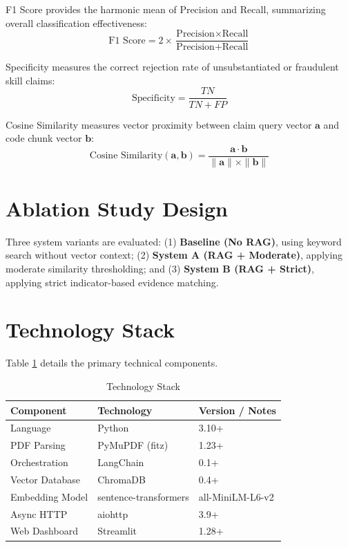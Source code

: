 F1 Score provides the harmonic mean of Precision and Recall, summarizing overall classification effectiveness:
\begin{equation}
\text{F1 Score} = 2 \times \frac{\text{Precision} \times \text{Recall}}{\text{Precision} + \text{Recall}}
\end{equation}

Specificity measures the correct rejection rate of unsubstantiated or fraudulent skill claims:
\begin{equation}
\text{Specificity} = \frac{TN}{TN + FP}
\end{equation}

Cosine Similarity measures vector proximity between claim query vector $\mathbf{a}$ and code chunk vector $\mathbf{b}$:
\begin{equation}
\text{Cosine Similarity}(\mathbf{a}, \mathbf{b}) = \frac{\mathbf{a} \cdot \mathbf{b}}{\|\mathbf{a}\| \times \|\mathbf{b}\|}
\end{equation}

\section{Ablation Study Design}

Three system variants are evaluated: (1) \textbf{Baseline (No RAG)}, using keyword search without vector context; (2) \textbf{System A (RAG + Moderate)}, applying moderate similarity thresholding; and (3) \textbf{System B (RAG + Strict)}, applying strict indicator-based evidence matching.

\section{Technology Stack}

Table \ref{tab:techstack} details the primary technical components.

\begin{table}[htbp]
\centering
\small
\setlength{\tabcolsep}{10pt}
\caption{Technology Stack}
\label{tab:techstack}
\begin{tabularx}{\textwidth}{@{}llX@{}}
\toprule
\textbf{Component} & \textbf{Technology} & \textbf{Version / Notes} \\ \midrule
Language & Python & 3.10+ \\
PDF Parsing & PyMuPDF (fitz) \cite{ref40} & 1.23+ \\
Orchestration & LangChain \cite{ref27} & 0.1+ \\
Vector Database & ChromaDB \cite{ref31} & 0.4+ \\
Embedding Model & sentence-transformers \cite{ref35} & all-MiniLM-L6-v2 \\
Async HTTP & aiohttp & 3.9+ \\
Web Dashboard & Streamlit \cite{ref49} & 1.28+ \\ \bottomrule
\end{tabularx}
\end{table}

